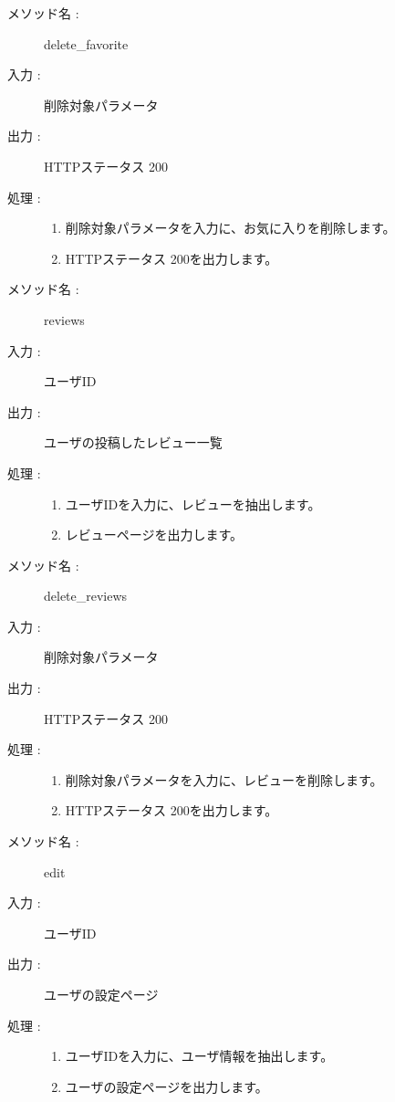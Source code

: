 \documentclass[a4j,titlepage]{jarticle}
\begin{document}
\clearpage

\begin{description}
\item [メソッド名 :] delete\_favorite
\item [入力 :] 削除対象パラメータ
\item [出力 :] HTTPステータス 200
\item [処理 :]\mbox{}
  \begin{enumerate}
  \item 削除対象パラメータを入力に、お気に入りを削除します。
  \item HTTPステータス 200を出力します。
  \end{enumerate}
\end{description}

\begin{description}
\item [メソッド名 :] reviews
\item [入力 :] ユーザID
\item [出力 :] ユーザの投稿したレビュー一覧
\item [処理 :]\mbox{}
  \begin{enumerate}
  \item ユーザIDを入力に、レビューを抽出します。
  \item レビューページを出力します。
 \end{enumerate}
\end{description}

\begin{description}
\item [メソッド名 :] delete\_reviews
\item [入力 :] 削除対象パラメータ
\item [出力 :] HTTPステータス 200
\item [処理 :]\mbox{}
  \begin{enumerate}
    \item 削除対象パラメータを入力に、レビューを削除します。
    \item HTTPステータス 200を出力します。
 \end{enumerate}
\end{description}

\begin{description}
\item [メソッド名 :] edit
\item [入力 :] ユーザID
\item [出力 :] ユーザの設定ページ
\item [処理 :]\mbox{}
  \begin{enumerate}
  \item ユーザIDを入力に、ユーザ情報を抽出します。
  \item ユーザの設定ページを出力します。
 \end{enumerate}
\end{description}
\end{document}
